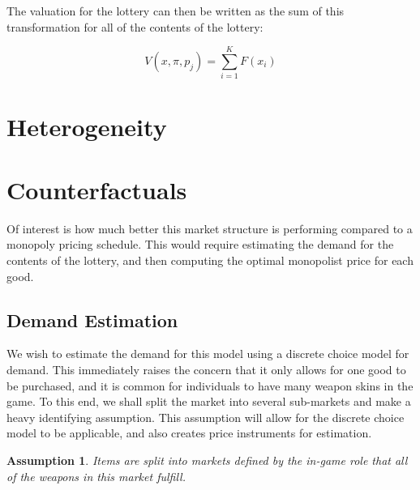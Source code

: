 \documentclass[12pt]{paper}
\newtheorem{assume}{Assumption}
\begin{document}
The valuation for the lottery can then be written as the sum of this
transformation for all of the contents of the lottery:

\begin{equation*}
  V(x,\pi,p_j) = \sum_{i=1}^K F( x_i)
\end{equation*}


\section{Heterogeneity}




\section{Counterfactuals}

Of interest is how much better this market structure is performing
compared to a monopoly pricing schedule. This would require estimating
the demand for the contents of the lottery, and then computing the
optimal monopolist price for each good. 




 \subsection{Demand Estimation}

We wish to estimate the demand for this model using a discrete choice
model for demand. This immediately raises the concern that it only
allows for one good to be purchased, and it is common for individuals
to have many weapon skins in the game. To this end, we shall split the
market into several sub-markets and make a heavy identifying
assumption. This assumption will allow for the discrete choice model
to be applicable, and also creates price instruments for estimation.

\begin{assume}
  Items are split into markets defined by the in-game role that all of
  the weapons in this market fulfill.
\end{assume}
\end{document}

